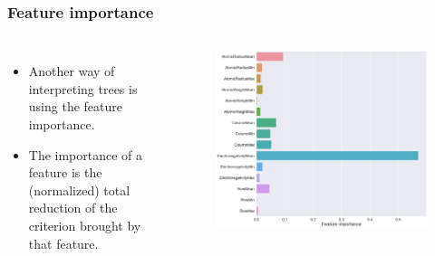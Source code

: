 \documentclass{beamer}
\begin{document}
\begin{frame}
\frametitle{Feature importance}
\begin{columns}
\begin{itemize}
\item Another way of interpreting trees is using the feature importance.
\item The importance of a feature is the (normalized) total reduction of the criterion brought by that feature.
\end{itemize}
\begin{figure}
    \centering
    \includegraphics[width=\textwidth]{figures/feature-importance.png}
\end{figure}
\end{columns}
\end{frame}
\end{document}
